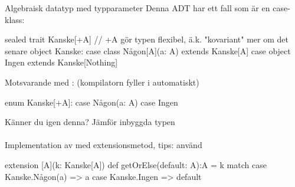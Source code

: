 \begin{Slide}{Algebraisk datatyp med typparameter}\SlideFontSmall
Denna ADT har ett fall som är en  case-klass:     
\begin{CodeSmall}
sealed trait Kanske[+A]   // +A gör typen flexibel, ä.k. "kovariant" mer om det senare
object Kanske:
  case class Någon[A](a: A) extends Kanske[A]
  case object Ingen extends Kanske[Nothing]   
\end{CodeSmall}
\pause Motsvarande med : (kompilatorn fyller i  automatiskt)
\begin{CodeSmall}
enum Kanske[+A]:
  case Någon(a: A)
  case Ingen     
\end{CodeSmall}
Känner du igen denna? \pause Jämför inbyggda typen \\~\\Implementation av  med extensionsmetod, tips: använd  \pause
\begin{CodeSmall}
extension [A](k: Kanske[A]) def getOrElse(default: A):A = k match 
  case Kanske.Någon(a) => a
  case Kanske.Ingen => default
\end{CodeSmall}     
\end{Slide}

